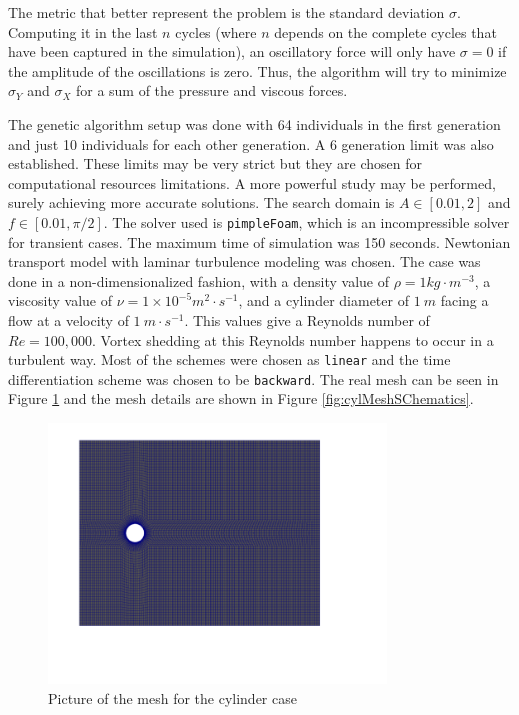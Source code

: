 The metric that better represent the problem is the standard deviation $\sigma$. Computing it in the last $n$ cycles (where $n$ depends on the complete cycles that have been captured in the simulation), an oscillatory force will only have $\sigma=0$ if the amplitude of the oscillations is zero. Thus, the algorithm will try to minimize $\sigma_Y$ and $\sigma_X$ for a sum of the pressure and viscous forces.

The genetic algorithm setup was done with 64 individuals in the first generation and just 10 individuals for each other generation. A 6 generation limit was also established. These limits may be very strict but they are chosen for computational resources limitations. A more powerful study may be performed, surely achieving more accurate solutions. The search domain is $A\in[0.01,2]$ and $f\in[0.01,\pi/2]$. The solver used is \texttt{pimpleFoam}, which is an incompressible solver for transient cases. The maximum time of simulation was 150 seconds. Newtonian transport model with laminar turbulence modeling was chosen. The case was done in a non-dimensionalized fashion, with a density value of $\rho=1 kg\cdot m^{-3}$, a viscosity value of $\nu=1\times 10^{-5} m^2\cdot s^{-1}$, and a cylinder diameter of $1\ m$ facing a flow at a velocity of $1\ m\cdot s^{-1}$. This values give a Reynolds number of $Re = 100,000$. Vortex shedding at this Reynolds number happens to occur in a turbulent way. Most of the schemes were chosen as \texttt{linear} and the time differentiation scheme was chosen to be \texttt{backward}. The real mesh can be seen in Figure \ref{fig:cylMeshSChematicsPF} and the mesh details are shown in Figure \ref{fig:cylMeshSChematics}.


    \begin{figure}[h!]
        \centering
        \includegraphics[width=0.8\textwidth]{Figures/3/cylinderMeshPF.png}
        \caption{Picture of the mesh for the cylinder case}
        \label{fig:cylMeshSChematicsPF}
    \end{figure}

